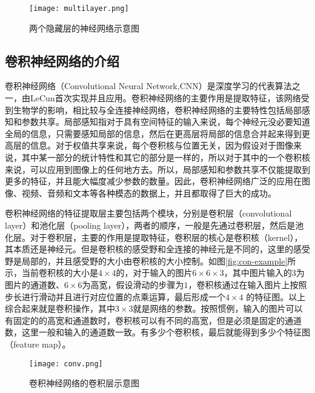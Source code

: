 \begin{figure}[htpb]
	\centering
	\texttt{[image: multilayer.png]}
    \caption{两个隐藏层的神经网络示意图}
	\vspace*{-3.5mm}
	\label{fig:mnn-example}
\end{figure}


\subsection{卷积神经网络的介绍}
卷积神经网络（Convolutional Neural Network,CNN）是深度学习的代表算法之一，由LeCun首次实现并且应用。卷积神经网络的主要作用是提取特征，该网络受到生物学的影响，相比较与全连接神经网络，卷积神经网络的主要特性包括局部感知和参数共享。局部感知指对于具有空间特征的输入来说，每个神经元没必要知道全局的信息，只需要感知局部的信息，然后在更高层将局部的信息合并起来得到更高层的信息。对于权值共享来说，每个卷积核与位置无关，因为假设对于图像来说，其中某一部分的统计特性和其它的部分是一样的，所以对于其中的一个卷积核来说，可以应用到图像上的任何地方去。所以，局部感知和参数共享不仅能提取到更多的特征，并且能大幅度减少参数的数量。因此，卷积神经网络广泛的应用在图像、视频、音频和文本等各种模态的数据上，并且都取得了巨大的成功。

卷积神经网络的特征提取层主要包括两个模块，分别是卷积层（convolutional layer）和池化层（pooling layer），两者的顺序，一般是先通过卷积层，然后是池化层。对于卷积层，主要的作用是提取特征，卷积层的核心是卷积核（kernel），其本质还是神经元。但是卷积核的感受野和全连接的神经元是不同的，这里的感受野是局部的，并且感受野的大小由卷积核的大小控制。如图\ref{fig:con-example}所示，当前卷积核的大小是$4 \times 4$的，对于输入的图片$6 \times 6 \times 3$，其中图片输入的3为图片的通道数、$6 \times 6$为高宽，假设滑动的步骤为$1$，卷积核通过在输入图片上按照步长进行滑动并且进行对应位置的点乘运算，最后形成一个$4 \times 4$ 的特征图。以上综合起来就是卷积操作，其中$3 \times 3$就是网络的参数。按照惯例，输入的图片可以有固定的的高宽和通道数时，卷积核可以有不同的高宽，但是必须是固定的通道数，这里一般和输入的通道数一致。有多少个卷积核，最后就能得到多少个特征图（feature map）。
\begin{figure}[htpb]
	\centering
	\texttt{[image: conv.png]}
    \caption{卷积神经网络的卷积层示意图}
	\vspace*{-3.5mm}
	\label{fig:conv-example}
\end{figure}

